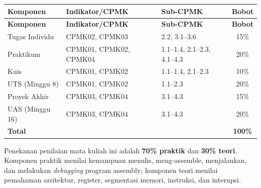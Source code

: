 \begin{longtable}{@{}p{3.3cm}p{7.3cm}p{2.3cm}c@{}}
\toprule
\textbf{Komponen} & \textbf{Indikator/CPMK} & \textbf{Sub-CPMK} &
\textbf{Bobot} \\
\midrule
\endfirsthead
\toprule
\textbf{Komponen} & \textbf{Indikator/CPMK} & \textbf{Sub-CPMK} &
\textbf{Bobot} \\
\midrule
\endhead
\bottomrule
\endfoot
Tugas Individu & CPMK02, CPMK03 & 2.2, 3.1--3.6 & 15\% \\
\addlinespace
Praktikum & CPMK01, CPMK02, CPMK04 & 1.1--1.4, 2.1--2.3, 4.1--4.3 &
20\% \\
\addlinespace
Kuis & CPMK01, CPMK02 & 1.1--1.4, 2.1--2.3 & 10\% \\
\addlinespace
UTS (Minggu 8) & CPMK01, CPMK02 & 1.1--2.3 & 20\% \\
\addlinespace
Proyek Akhir & CPMK03, CPMK04 & 3.1--4.3 & 15\% \\
\addlinespace
UAS (Minggu 16) & CPMK03, CPMK04 & 3.1--4.3 & 20\% \\
\midrule
\textbf{Total} & & & \textbf{100\%} \\
\bottomrule
\end{longtable}

\vspace{0.4cm}

\begin{infobox}
Penekanan penilaian mata kuliah ini adalah \textbf{70\% praktik} dan
\textbf{30\% teori}. Komponen praktik menilai kemampuan menulis,
meng-assemble, menjalankan, dan melakukan \textit{debugging} program
assembly; komponen teori menilai pemahaman arsitektur, register,
segmentasi memori, instruksi, dan interupsi.
\end{infobox}

\clearpage
